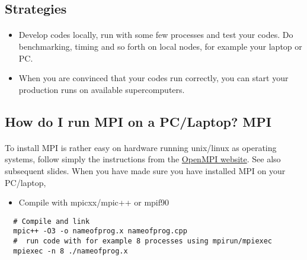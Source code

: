 \documentclass[%
oneside,                 %
final,                   %
10pt]{article}
\begin{document}
\subsection*{Strategies}

\paragraph{}
\begin{itemize}
\item Develop codes locally, run with some few processes and test your codes.  Do benchmarking, timing and so forth on local nodes, for example your laptop or PC. 

\item When you are convinced that your codes run correctly, you can start your production runs on available supercomputers.
\end{itemize}

\noindent



\subsection*{How do I run MPI on a PC/Laptop? MPI}

\paragraph{}
To install MPI is rather easy on hardware running unix/linux as operating systems, follow simply the instructions from the \href{{https://www.open-mpi.org/}}{OpenMPI website}. See also subsequent slides.
When you have made sure you have installed MPI on your PC/laptop, 
\begin{itemize}
\item Compile with mpicxx/mpic++ or mpif90
\end{itemize}

\noindent





\begin{verbatim}
  # Compile and link
  mpic++ -O3 -o nameofprog.x nameofprog.cpp
  #  run code with for example 8 processes using mpirun/mpiexec
  mpiexec -n 8 ./nameofprog.x

\end{verbatim}
\end{document}
